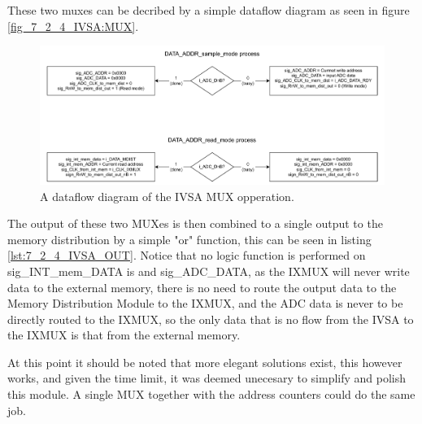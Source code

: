 These two muxes can be decribed by a simple dataflow diagram as seen in figure \ref{fig_7_2_4_IVSA:MUX}.

\begin{figure}[H]
    \centering
    \includegraphics[clip, trim=0 0 0 0, width=1\textwidth]{Sections/7_SystemDesign/Figures/SMPLT_MUX.pdf}
    \caption{A dataflow diagram of the IVSA MUX opperation.}
    \label{fig_7_2_4_IVSA_MUX}
\end{figure}

The output of these two MUXes is then combined to a single output to the memory distribution by a simple "or" function, this can be seen in listing \ref{lst:7_2_4_IVSA_OUT}. Notice that no logic function is performed on sig\_INT\_mem\_DATA is and sig\_ADC\_DATA, as the IXMUX will never write data to the external memory, there is no need to route the output data to the Memory Distribution Module to the IXMUX, and the ADC data is never to be directly routed to the IXMUX, so the only data that is no flow from the IVSA to the IXMUX is that from the external memory.



At this point it should be noted that more elegant solutions exist, this however works, and given the time limit, it was deemed unecesary to simplify and polish this module. A single MUX together with the address counters could do the same job.
